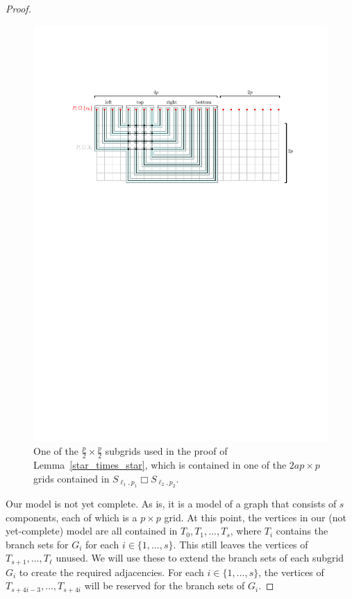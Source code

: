 \documentclass[kpfonts,lotsofwhite]{patmorin}
\newcommand{\boxprod}{\mathbin{\Box}}
\theoremstyle{plain}
\theoremstyle{definition}
\begin{document}
\begin{proof}
  \begin{figure}
    \begin{center}
      \includegraphics{subgrid}
    \end{center}
    \caption{One of the $\tfrac p2\times \tfrac p2$ subgrids used in the proof of Lemma~\ref{star_times_star}, which is contained in one of the $2ap\times p$ grids contained in $S_{\ell_1,p_1}\boxprod S_{\ell_2,p_2}$.}
    \label{subgrid}
  \end{figure}

  Our model is not yet complete.  As is, it is a model of a graph that consists of $s$ components, each of which is a $p\times p$ grid.  At this point, the vertices in our (not yet-complete) model are all contained in $T_0,T_1,\ldots,T_s$, where $T_i$ contains the branch sets for $G_i$ for each $i\in\{1,\ldots,s\}$.  This still leaves the vertices of $T_{s+1},\ldots,T_\ell$ unused.  We will use these to extend the branch sets of each subgrid $G_i$ to create the required adjacencies.  For each $i\in\{1,\ldots,s\}$, the vertices of $T_{s+4i-3},\ldots,T_{s+4i}$ will be reserved for the branch sets of $G_i$.


\end{proof}
\end{document}
